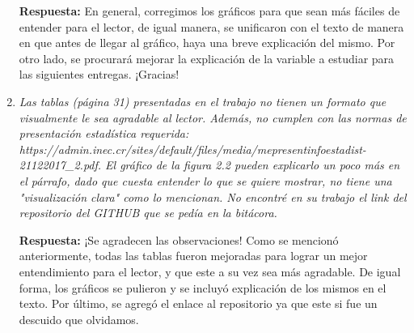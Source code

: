 \begin{enumerate}
    \textbf{Respuesta:} En general, corregimos los gráficos para que sean más fáciles de entender para el lector, de igual manera, se unificaron con el texto de manera en que antes de llegar al gráfico, haya una breve explicación del mismo. Por otro lado, se procurará mejorar la explicación de la variable a estudiar para las siguientes entregas. ¡Gracias!

    \item \textit{Las tablas (página 31) presentadas en el trabajo no tienen un formato que visualmente le sea agradable al lector.  Además, no cumplen con las normas de presentación estadística requerida:  https://admin.inec.cr/sites/default/files/media/mepresentinfoestadist-21122017\_2.pdf. El gráfico de la figura 2.2 pueden explicarlo un poco más en el párrafo, dado que cuesta entender lo que se quiere mostrar, no tiene una "visualización clara" como lo mencionan. No encontré en su trabajo el link del repositorio del GITHUB  que se pedía en la bitácora.}

    \textbf{Respuesta:} ¡Se agradecen las observaciones! Como se mencionó anteriormente, todas las tablas fueron mejoradas para lograr un mejor entendimiento para el lector, y que este a su vez sea más agradable. De igual forma, los gráficos se pulieron y se incluyó explicación de los mismos en el texto. Por último, se agregó el enlace al repositorio ya que este si fue un descuido que olvidamos.
    
\end{enumerate}